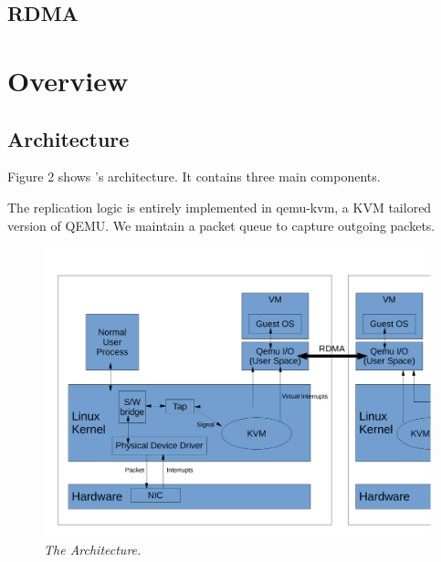 \subsection{\paxos}\label{sec:paxos}

\subsection{RDMA} \label{sec:rdma}

\section{\xxx Overview} \label{sec:overview}

\subsection{Architecture} \label{sec:arch}

Figure 2 shows \xxx's architecture. It contains three main components.

The replication logic is entirely implemented in qemu-kvm, a KVM tailored version of QEMU.
We maintain a packet queue to capture outgoing packets.

\begin{figure}[t]
\centering
\includegraphics[width=.47\textwidth]{figures/arch}
\vspace{-.2in}
\caption{{\em The \xxx Architecture.}} \label{fig:arc}
\vspace{.05in}
\end{figure}
